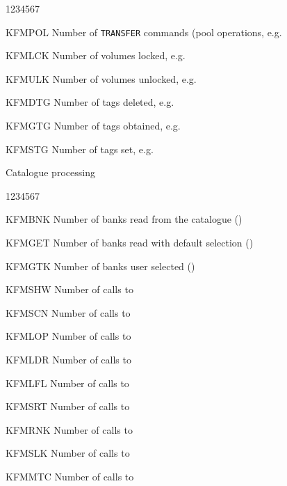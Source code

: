 \begin{OL}
\begin{DLtt}{1234567}
\item[KFMPOL]Number of {\tt TRANSFER} commands (pool operations, e.g. 
\item[KFMLCK]Number of volumes locked, e.g. 
\item[KFMULK]Number of volumes unlocked, e.g. 
\item[KFMDTG]Number of tags deleted, e.g. 
\item[KFMGTG]Number of tags obtained, e.g. 
\item[KFMSTG]Number of tags set, e.g. 
\end{DLtt}
\item
Catalogue processing
\begin{DLtt}{1234567}
\item[KFMBNK]Number of banks read from the catalogue ()
\item[KFMGET]Number of banks read with default selection ()
\item[KFMGTK]Number of banks user selected ()
\item[KFMSHW]Number of calls to 
\item[KFMSCN]Number of calls to 
\item[KFMLOP]Number of calls to 
\item[KFMLDR]Number of calls to 
\item[KFMLFL]Number of calls to 
\item[KFMSRT]Number of calls to 
\item[KFMRNK]Number of calls to 
\item[KFMSLK]Number of calls to 
\item[KFMMTC]Number of calls to 
\end{DLtt}
\end{OL}
